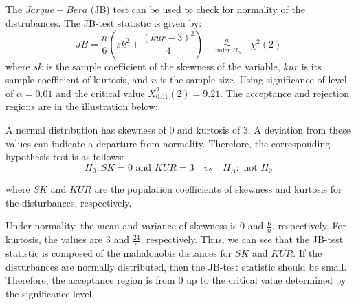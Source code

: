 \subsection{}

The $Jarque-Bera$ (JB) test can be used to check for normality of the distrubances. The JB-test statistic is given by:
$$JB = \dfrac{n}{6} \left( sk^2 + \dfrac{(kur-3)^2}{4} \right) \quad \overset{a}{\underset{\text{under }H_0}{\sim}} \quad \chi^2(2)$$
where $sk$ is the sample coefficient of the skewness of the variable, $kur$ is its sample coefficient of kurtosis, and $n$ is the sample size. Using significance of level of $\alpha = 0.01$ and the critical value $X^2_{0.01}(2) = 9.21$. The acceptance and rejection regions are in the illustration below:

\begin{center}
\end{center}

A normal distribution has skewness of 0 and kurtosis of 3.  A deviation from these values can indicate a departure from normality. Therefore, the corresponding hypothesis test is as follows:
$$
H_0: SK = 0 \text{ and } KUR = 3  \quad vs \quad H_A: \text{ not } H_0
$$

\noindent
where $SK$ and $KUR$ are the population coefficients of skewness and kurtosis for the disturbances, respectively. 

\medskip
\noindent
Under normality, the mean and variance of skewness is 0 and $\frac{6}{n}$, respectively. For kurtosis, the values are 3 and $\frac{24}{n}$, respectively. Thus, we can see that the JB-test statistic is composed of the mahalonobis distances for $SK$ and $KUR$. If the disturbances are normally distributed, then the JB-test statistic should be small. Therefore, the acceptance region is from 0 up to the critical value determined by the significance level.
